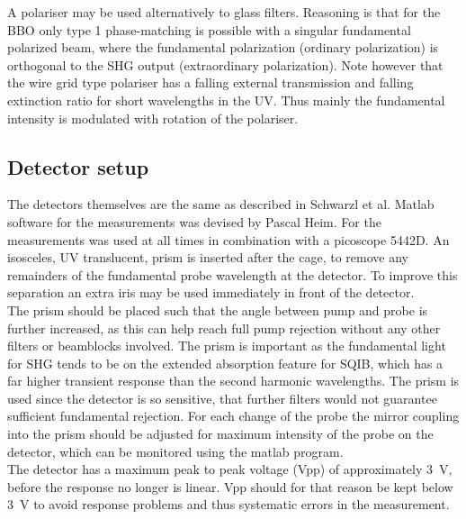 \documentclass[twoside,openright,listof=numbered]{scrreprt}
\begin{document}
A polariser may be used alternatively to glass filters. Reasoning is that for the BBO only type 1 phase-matching is possible with a singular fundamental polarized beam, where the fundamental polarization (ordinary polarization) is orthogonal to the SHG output (extraordinary polarization). Note however that the wire grid type polariser has a falling external transmission and falling extinction ratio for short wavelengths in the UV. Thus mainly the fundamental intensity is modulated with rotation of the polariser.

\subsection{Detector setup}
The detectors themselves are the same as described in Schwarzl et al\cite{Schwarzl2022}. Matlab software for the measurements was devised by Pascal Heim. For the measurements  was used at all times in combination with a picoscope 5442D. An isosceles, UV translucent, prism is inserted after the cage, to remove any remainders of the fundamental probe wavelength at the detector. To improve this separation an extra iris may be used immediately in front of the detector.\\
The prism should be placed such that the angle between pump and probe is further increased, as this can help reach full pump rejection without any other filters or beamblocks involved. The prism is important as the fundamental light for SHG tends to be on the extended absorption feature for SQIB, which has a far higher transient response than the second harmonic wavelengths. The prism is used since the detector is so sensitive, that further filters would not guarantee sufficient fundamental rejection. For each change of the probe the mirror coupling into the prism should be adjusted for maximum intensity of the probe on the detector, which can be monitored using the  matlab program.\\
The detector has a maximum peak to peak voltage (Vpp) of approximately \qty	{3}{\volt}, before the response no longer is linear. Vpp should for that reason be kept below \qty{3}{\volt} to avoid response problems and thus systematic errors in the measurement.
\end{document}
